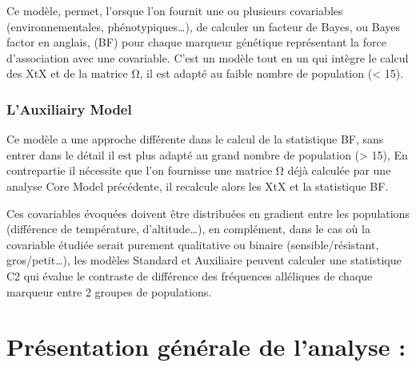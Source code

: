 \documentclass[
  openany]{book}
\theoremstyle{definition}
\theoremstyle{definition}
\theoremstyle{definition}
\theoremstyle{definition}
\theoremstyle{remark}
\begin{document}
Ce modèle, permet, l'orsque l'on fournit une ou plusieurs covariables (environnementales, phénotypiques\ldots), de calculer un facteur de Bayes, ou Bayes factor en anglais, (BF) pour chaque marqueur génétique représentant la force d'association avec une covariable. C'est un modèle tout en un qui intègre le calcul des XtX et de la matrice Ω, il est adapté au faible nombre de population (\textless{} 15).

\hypertarget{lauxiliairy-model}{%
\subsubsection*{L'Auxiliairy Model}\label{lauxiliairy-model}}

Ce modèle a une approche différente dans le calcul de la statistique BF, sans entrer dans le détail il est plus adapté au grand nombre de population (\textgreater{} 15), En contrepartie il nécessite que l'on fournisse une matrice Ω déjà calculée par une analyse Core Model précédente, il recalcule alors les XtX et la statistique BF.

Ces covariables évoquées doivent être distribuées en gradient entre les populations (différence de température, d'altitude\ldots), en complément, dans le cas où la covariable étudiée serait purement qualitative ou binaire (sensible/résistant, gros/petit\ldots), les modèles Standard et Auxiliaire peuvent calculer une statistique C2 qui évalue le contraste de différence des fréquences alléliques de chaque marqueur entre 2 groupes de populations.

\hypertarget{pruxe9sentation-guxe9nuxe9rale-de-lanalyse}{%
\section*{Présentation générale de l'analyse :}\label{pruxe9sentation-guxe9nuxe9rale-de-lanalyse}}
\end{document}
